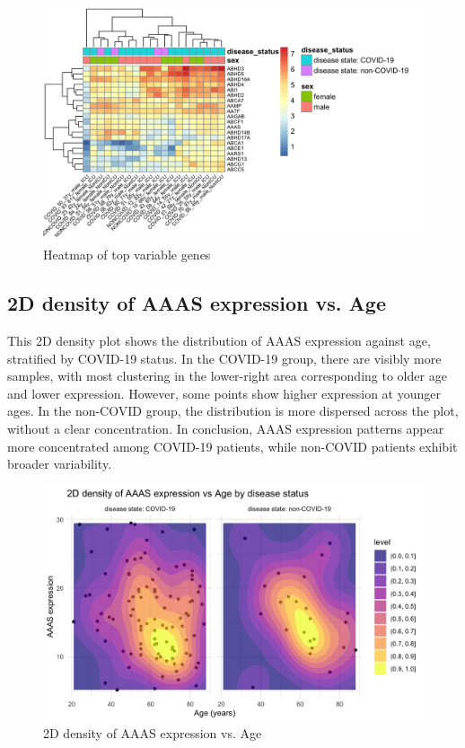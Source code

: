 \documentclass{article}
\begin{document}
\begin{figure}[H]
\centering
\includegraphics[width=0.80\linewidth]{heatmap.png}
\caption{\label{fig:heatmap}Heatmap of top variable genes}
\end{figure}

\subsection{2D density of AAAS expression vs. Age}

This 2D density plot shows the distribution of AAAS expression against age, stratified by COVID-19 status. In the COVID-19 group, there are visibly more samples, with most clustering in the lower-right area corresponding to older age and lower expression. However, some points show higher expression at younger ages. In the non-COVID group, the distribution is more dispersed across the plot, without a clear concentration. In conclusion, AAAS expression patterns appear more concentrated among COVID-19 patients, while non-COVID patients exhibit broader variability.

\begin{figure}[H]
\centering
\includegraphics[width=0.80\linewidth]{2D density of AAAS expression vs Age by disease status.png}
\caption{\label{fig:2Ddensity}2D density of AAAS expression vs. Age}
\end{figure}
\end{document}
